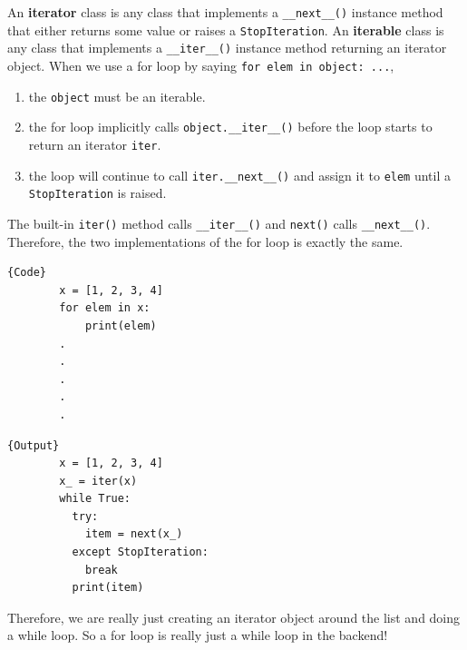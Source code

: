  \begin{definition}
    \label{def:iterables-and-iterators}
 
    An \textbf{iterator} class is any class that implements a \texttt{\_\_next\_\_()} instance method that either returns some value or raises a \texttt{StopIteration}. An \textbf{iterable} class is any class that implements a \texttt{\_\_iter\_\_()} instance method returning an iterator object. When we use a for loop by saying \texttt{for elem in object: ...}, 
    \begin{enumerate}
      \item the \texttt{object} must be an iterable. 
      \item the for loop implicitly calls \texttt{object.\_\_iter\_\_()} before the loop starts to return an iterator \texttt{iter}. 
      \item the loop will continue to call \texttt{iter.\_\_next\_\_()} and assign it to \texttt{elem} until a \texttt{StopIteration} is raised. 
    \end{enumerate}
    The built-in \texttt{iter()} method calls \texttt{\_\_iter\_\_()} and \texttt{next()} calls \texttt{\_\_next\_\_()}. Therefore, the two implementations of the for loop is exactly the same. 

    \noindent\begin{minipage}{.5\textwidth}
      \begin{lstlisting}[]{Code}
        x = [1, 2, 3, 4] 
        for elem in x: 
            print(elem)
        .
        .
        .
        .
        .
      \end{lstlisting}
      \end{minipage}
      \hfill
      \begin{minipage}{.49\textwidth}
      \begin{lstlisting}[]{Output}
        x = [1, 2, 3, 4] 
        x_ = iter(x) 
        while True: 
          try: 
            item = next(x_)
          except StopIteration: 
            break 
          print(item)
      \end{lstlisting}
    \end{minipage}
    Therefore, we are really just creating an iterator object around the list and doing a while loop. So a for loop is really just a while loop in the backend!  
  \end{definition} 

